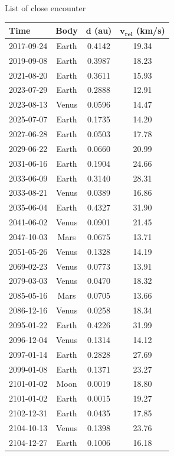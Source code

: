 \documentclass[final]{beamer}
\newlength{\onecolwid}
\begin{document}
\begin{frame}[t]
\begin{columns}[t]
\begin{column}{\onecolwid}
\begin{alertblock}{List of close encounter}
\begin{table}
\vspace{2ex}
\begin{tabular}{l c c c}
\toprule
\textbf{Time} & \textbf{   Body   } & \textbf{  $\boldsymbol{d}$ (au)  } & \textbf{$\boldsymbol{v_{rel}}$ (km/s)} \\
\midrule2017-09-24 & Earth & 0.4142 & 19.34 \\ 
2019-09-08 & Earth & 0.3987 & 18.23 \\ 
2021-08-20 & Earth & 0.3611 & 15.93 \\ 
2023-07-29 & Earth & 0.2888 & 12.91 \\ 
2023-08-13 & Venus & 0.0596 & 14.47 \\ 
2025-07-07 & Earth & 0.1735 & 14.20 \\ 
2027-06-28 & Earth & 0.0503 & 17.78 \\ 
2029-06-22 & Earth & 0.0660 & 20.99 \\ 
2031-06-16 & Earth & 0.1904 & 24.66 \\ 
2033-06-09 & Earth & 0.3140 & 28.31 \\ 
2033-08-21 & Venus & 0.0389 & 16.86 \\ 
2035-06-04 & Earth & 0.4327 & 31.90 \\ 
2041-06-02 & Venus & 0.0901 & 21.45 \\ 
2047-10-03 & Mars & 0.0675 & 13.71 \\ 
2051-05-26 & Venus & 0.1328 & 14.19 \\ 
2069-02-23 & Venus & 0.0773 & 13.91 \\ 
2079-03-03 & Venus & 0.0470 & 18.32 \\ 
2085-05-16 & Mars & 0.0705 & 13.66 \\ 
2086-12-16 & Venus & 0.0258 & 18.34 \\ 
2095-01-22 & Earth & 0.4226 & 31.99 \\ 
2096-12-04 & Venus & 0.1314 & 14.12 \\ 
2097-01-14 & Earth & 0.2828 & 27.69 \\ 
2099-01-08 & Earth & 0.1371 & 23.27 \\ 
2101-01-02 & Moon & 0.0019 & 18.80 \\ 
2101-01-02 & Earth & 0.0015 & 19.27 \\ 
2102-12-31 & Earth & 0.0435 & 17.85 \\ 
2104-10-13 & Venus & 0.1398 & 23.76 \\ 
2104-12-27 & Earth & 0.1006 & 16.18 \\ 

\end{tabular}
\end{table}
\end{alertblock}
\end{column}
\end{columns}
\end{frame}
\end{document}
